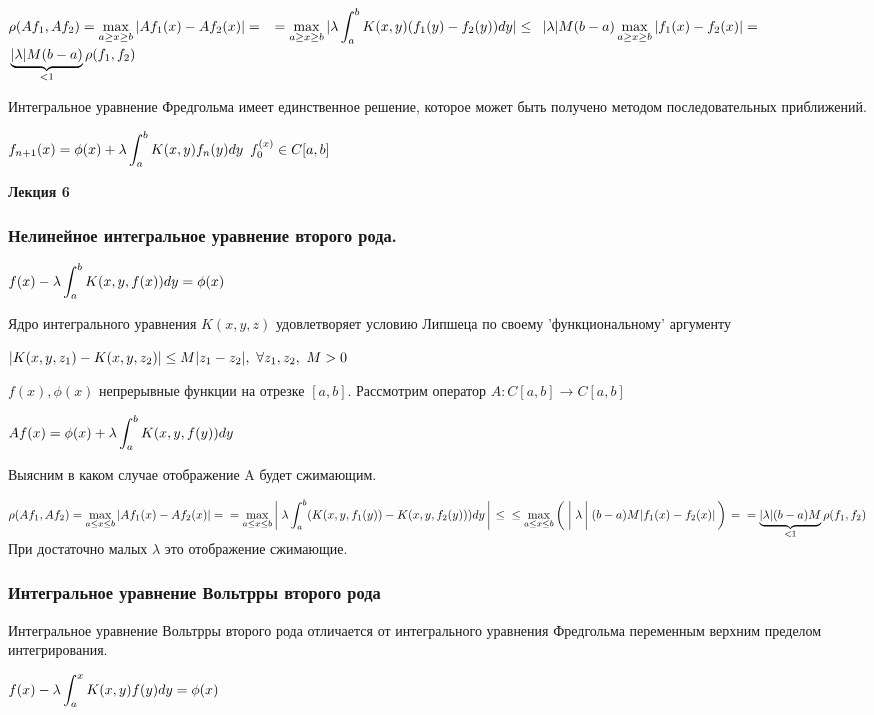 \documentclass[12pt]{report}
\renewcommand{\[}{$\\\displaystyle}
\renewcommand{\]}{\\$}
\renewcommand{\[}{$\\\displaystyle}
\newcommand{\sep}{,\ }
\newcommand{\bb}[1][]{\left#1\vphantom{\int_1^2}\right.}
\begin{document}
\[ \rho(Af_1,Af_2)=\max_{a\geq x \geq b}|Af_1(x)-Af_2(x)|=\]
\[ =\max_{a\geq x \geq b} |\lambda\int_a^bK(x, y)(f_1(y)-f_2(y))dy|\leq\]
\[ |\lambda|M(b-a)\max_{a\geq x \geq b}|f_1(x)-f_2(x)|=\]
\[ \underbrace{|\lambda|M(b-a)}_{<1}\rho(f_1,f_2) \]

Интегральное уравнение Фредгольма имеет единственное решение, которое может быть получено методом последовательных приближений.

\[ f_{n+1}(x)=\phi(x)+\lambda\int_a^bK(x,y)f_n(y)dy\]
\[ f_0^{(x)} \in C[a,b]\]

\textbf{Лекция 6}

\subsubsection{Нелинейное интегральное уравнение второго рода.}

\[ f(x)-\lambda\int_a^bK(x,y,f(x))dy=\phi(x)\]

Ядро интегрального уравнения $K(x,y,z)$ удовлетворяет условию Липшеца по своему 'функциональному' аргументу

\[|K(x,y,z_1)-K(x,y,z_2)|\leq M|z_1-z_2|\sep\forall z_1,z_2\sep M>0\]


$f(x), \phi(x)$ непрерывные функции на отрезке $[a,b]$. Рассмотрим оператор $A:C[a,b]\rightarrow C[a,b]$

\[ Af(x) = \phi(x)+\lambda\int_a^bK(x,y,f(y))dy \]

Выясним в каком случае отображение A будет сжимающим.

\[ \rho(Af_1, Af_2) = \max_{a\leq x\leq b}|Af_1(x)-Af_2(x)|=\\=
\max_{a\leq x\leq b}\bb[|]\lambda\int_a^b(K(x,y,f_1(y))-K(x,y,f_2(y)))dy\bb[|]\leq\\\leq
\max_{a\leq x\leq b}\bb[(]\bb[|]\lambda\bb[|](b-a)M|f_1(x)-f_2(x)|\bb[)] = \\
= \underbrace{|\lambda|(b-a)M}_{<1}\rho(f_1,f_2)
\]
При достаточно малых $\lambda$ это отображение сжимающие.

\subsubsection{Интегральное уравнение Вольтрры второго рода}

Интегральное уравнение Вольтрры второго рода отличается от интегрального уравнения Фредгольма переменным верхним пределом интегрирования.

\[ f(x)-\lambda \int_a^xK(x,y)f(y)dy=\phi(x)\]
\end{document}
